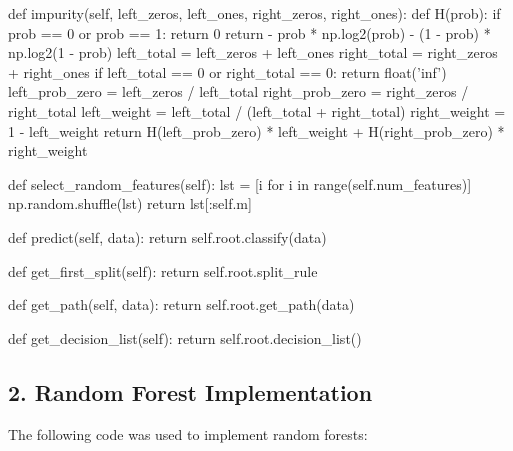 \documentclass{article}
\begin{document}
\begin{python}
    def impurity(self, left_zeros, left_ones, right_zeros, right_ones):
        def H(prob):
            if prob == 0 or prob == 1:
                return 0
            return - prob * np.log2(prob) - (1 - prob) * np.log2(1 - prob)
        left_total = left_zeros + left_ones
        right_total = right_zeros + right_ones
        if left_total == 0 or right_total == 0:
            return float('inf')
        left_prob_zero = left_zeros / left_total
        right_prob_zero = right_zeros / right_total
        left_weight = left_total / (left_total + right_total)
        right_weight = 1 - left_weight
        return H(left_prob_zero) * left_weight + H(right_prob_zero) * right_weight

    def select_random_features(self):
        lst = [i for i in range(self.num_features)]
        np.random.shuffle(lst)
        return lst[:self.m]

    def predict(self, data):
        return self.root.classify(data)

    def get_first_split(self):
        return self.root.split_rule

    def get_path(self, data):
        return self.root.get_path(data)

    def get_decision_list(self):
        return self.root.decision_list()

\end{python}

\newpage

\subsection*{2. Random Forest Implementation}
The following code was used to implement random forests:
\end{document}
